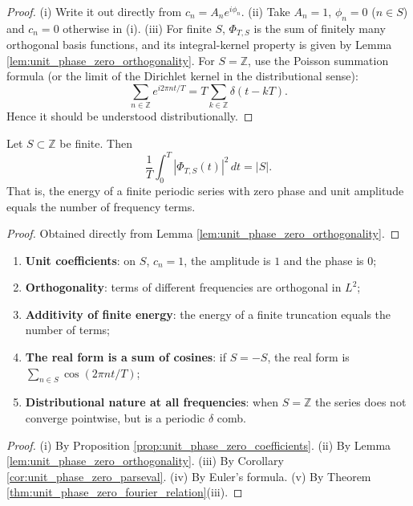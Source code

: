 \begin{proof}
(i) Write it out directly from $c_n=A_n e^{i\phi_n}$.
(ii) Take $A_n=1$, $\phi_n=0$ ($n\in S$) and $c_n=0$ otherwise in (i).
(iii) For finite $S$, $\Phi_{T,S}$ is the sum of finitely many orthogonal basis functions, and its integral-kernel property is given by Lemma \ref{lem:unit_phase_zero_orthogonality}. For $S=\mathbb{Z}$, use the Poisson summation formula (or the limit of the Dirichlet kernel in the distributional sense):
\[
\sum_{n\in\mathbb{Z}}e^{i2\pi n t/T}
= T\sum_{k\in\mathbb{Z}}\delta(t-kT).
\]
Hence it should be understood distributionally.
\end{proof}

\begin{corollary}\label{cor:unit_phase_zero_parseval}
Let $S\subset\mathbb{Z}$ be finite. Then
\[
\frac{1}{T}\int_0^T |\Phi_{T,S}(t)|^2\,dt = |S|.
\]
That is, the energy of a finite periodic series with zero phase and unit amplitude equals the number of frequency terms.
\end{corollary}

\begin{proof}
Obtained directly from Lemma \ref{lem:unit_phase_zero_orthogonality}.
\end{proof}

\begin{property}\label{prop:unit_phase_zero_properties}
\begin{enumerate}[label=(\roman*)]
    \item \textbf{Unit coefficients}: on $S$, $c_n=1$, the amplitude is $1$ and the phase is $0$;
    \item \textbf{Orthogonality}: terms of different frequencies are orthogonal in $L^2$;
    \item \textbf{Additivity of finite energy}: the energy of a finite truncation equals the number of terms;
    \item \textbf{The real form is a sum of cosines}: if $S=-S$, the real form is $\sum_{n\in S}\cos(2\pi n t/T)$;
    \item \textbf{Distributional nature at all frequencies}: when $S=\mathbb{Z}$ the series does not converge pointwise, but is a periodic $\delta$ comb.
\end{enumerate}
\end{property}

\begin{proof}
(i) By Proposition \ref{prop:unit_phase_zero_coefficients}. (ii) By Lemma \ref{lem:unit_phase_zero_orthogonality}. (iii) By Corollary \ref{cor:unit_phase_zero_parseval}. (iv) By Euler's formula. (v) By Theorem \ref{thm:unit_phase_zero_fourier_relation}(iii).
\end{proof}

